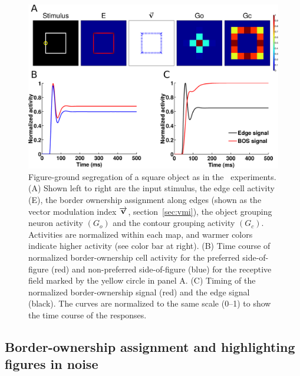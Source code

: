 \begin{figure}[t!]
\centering
\includegraphics[width=\textwidth]{Contour/figs/Fig6.eps}
\makeatletter
\let\@currsize\normalsize
\caption[Time course of figure-ground segregation]{Figure-ground segregation of a square object as in the~\citet{Zhou_etal00} experiments. (A) Shown left to right are the input stimulus, the edge cell activity (E), the border ownership assignment along edges (shown as the vector modulation index $\protect\overrightarrow{\mathbf{v}}$, section~\ref{sec:vmi}), the object grouping neuron activity $(G_o)$ and the contour grouping activity $(G_c)$. Activities are normalized within each map, and warmer colors indicate higher activity (see color bar at right). (B) Time course of normalized border-ownership cell activity for the preferred side-of-figure (red) and non-preferred side-of-figure (blue) for the receptive field marked by the yellow circle in panel A.
(C) Timing of the  normalized border-ownership signal (red) and the edge signal (black).
The curves are normalized to the same scale (0--1) to show the time course of the responses.}
\label{Fig:BOS_timecourse}
\end{figure}

\subsection{Border-ownership assignment and highlighting figures in noise}
\label{sec:BOS}

